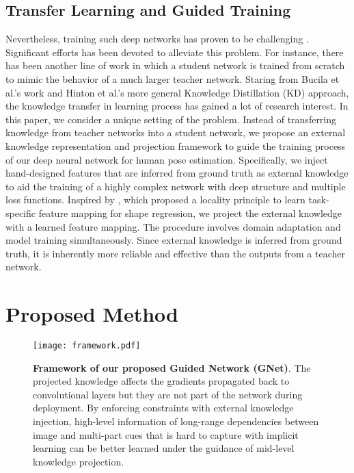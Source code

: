 \documentclass[journal ]{IEEEtran}
\begin{document}
\subsection{Transfer Learning and Guided Training}

Nevertheless, training such deep networks has proven to be challenging \cite{erhan2009difficulty}. Significant efforts has been devoted to alleviate this problem. 
For instance, there has been another line of work in which a student network is trained from scratch to mimic the behavior of a much larger teacher network. Staring from Bucila et al.’s work \cite{buciluǎ2006model} and Hinton et al.’s more general Knowledge Distillation (KD) \cite{hinton2015distilling} approach, the knowledge transfer in learning process has gained a lot of research interest. 
In this paper, we consider a unique setting of the problem. Instead of transferring knowledge from teacher networks into a student network, we propose an external knowledge representation and projection framework to guide the training process of our deep neural network for human pose estimation. 
Specifically, we inject hand-designed features that are inferred from ground truth as external knowledge to aid the training of a highly complex network with deep structure and multiple loss functions. 
Inspired by \cite{ren2014face}, which proposed a locality principle to learn task-specific feature mapping for shape regression, we project the external knowledge with a learned feature mapping. 
The procedure involves domain adaptation and model training simultaneously. Since external knowledge is inferred from ground truth, it is inherently more reliable and effective than the outputs from a teacher network.


\section{Proposed Method}
\label{sec:proposed-method}

\begin{figure}[t]
	\begin{center}
		\texttt{[image: framework.pdf]}
	\end{center}
	\caption{\textbf{Framework of our proposed Guided Network (GNet)}. The projected knowledge affects the gradients propagated back to convolutional layers but they are not part of the network during deployment. By enforcing constraints with external knowledge injection, high-level information of long-range dependencies between image and multi-part cues that is hard to capture with implicit learning can be better learned under the guidance of mid-level knowledge projection.}
	\label{fig:framework}
\end{figure}
\end{document}
